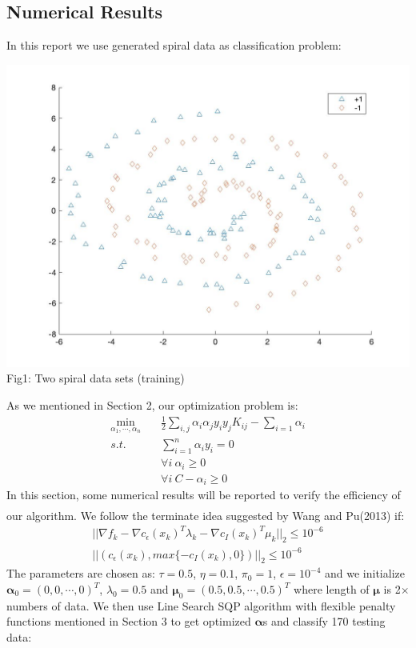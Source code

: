 \documentclass{article}
\newcommand{\upcite}[1]{\textsuperscript{\textsuperscript{\cite{#1}}}}
\begin{document}
\begin{spacing}{1.5}
\section{Numerical Results}
In this report we use generated spiral data as classification problem:
\begin{center}
\includegraphics[width=0.9\linewidth]{training_data.jpg}\\
Fig1: Two spiral data sets (training)
\end{center}
As we mentioned in Section 2, our optimization problem is:
\begin{align}
\min_{\alpha_1,\cdots,\alpha_n}&\quad \frac{1}{2}\sum_{i,j}\alpha_i\alpha_jy_iy_jK_{ij}-\sum_{i=1}\alpha_i\\
s.t. &\quad \sum^n_{i=1}\alpha_iy_i=0\\
&\quad \forall i\ \alpha_i\ge0\\
&\quad \forall i\ C-\alpha_i\ge0
\end{align}
In this section, some numerical results will be reported to verify the efficiency of our algorithm. We follow the terminate idea suggested by Wang and Pu(2013)\upcite{Ref9} if:
\begin{align}
||\nabla f_k-\nabla c_\epsilon(x_k)^T\lambda_k-\nabla c_I(x_k)^T\mu_k||_2\le10^{-6}\\
||(c_\epsilon(x_k),max\{-c_I(x_k),0\})||_2\le10^{-6}
\end{align}
The parameters are chosen as: $\tau=0.5$, $\eta=0.1$, $\pi_0=1$, $\epsilon=10^{-4}$ and we initialize $\bm{\alpha}_0=(0,0,\cdots,0)^T$, $\lambda_0=0.5$ and $\bm{\mu}_0=(0.5,0.5,\cdots,0.5)^T$ where length of $\bm{\mu}$ is 2$\times$numbers of data. We then use Line Search SQP algorithm with flexible penalty functions mentioned in Section 3 to get optimized $\bm{\alpha}$s and classify 170 testing data:

\end{spacing}
\end{document}
